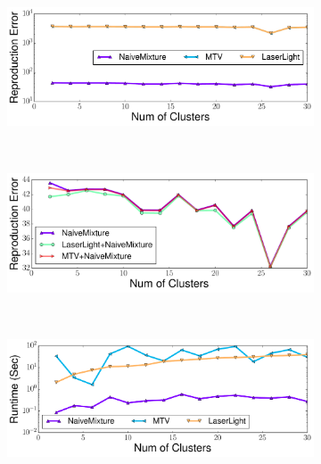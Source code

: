 \begin{figure}[ht!]
	\captionsetup[subfigure]{justification=centering}
    \centering
    \begin{subfigure}[b]{0.47\textwidth}
      \centering       
      \includegraphics[width=\textwidth]{QueryLogSummarization/graphics/PatternMixtureSummaryErrorComparisonAlone_bankdata.pdf}
          \label{fig:PatternMixtureEncodingErrorComparisonAlone_bankdata}
    \end{subfigure}
    ~
    \begin{subfigure}[b]{0.47\textwidth}
        \centering       
        \includegraphics[width=\textwidth]{QueryLogSummarization/graphics/PatternMixtureSummaryErrorComparisonPiggybacking_bankdata.pdf}
           \label{fig:PatternMixtureEncodingErrorComparisonPiggybacking_bankdata}
    \end{subfigure}
    ~
    \begin{subfigure}[b]{0.47\textwidth}
    \centering       
    \includegraphics[width=\textwidth]{QueryLogSummarization/graphics/PatternMixtureSummaryRunningTime_bankdata.pdf}
    \label{fig:mixtureencodingsrunningtimecomparison_bankdata}
    \end{subfigure}
   \label{fig:motivatenaivemixtureencodings_bankdata}
\trimfigurewhitespace
\end{figure}

